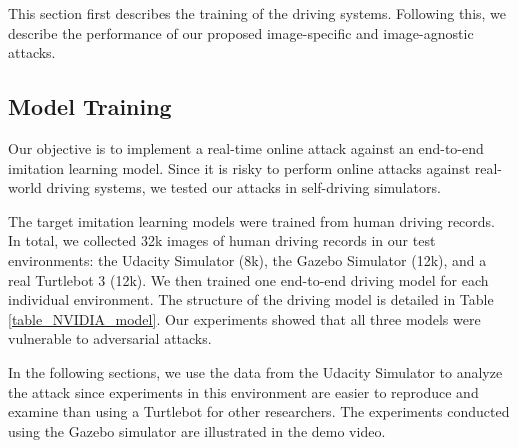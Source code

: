 This section first describes the training of the driving systems. Following this, we describe the performance of our proposed image-specific and image-agnostic attacks.



\subsection{Model Training}

Our objective is to implement a real-time online attack against an end-to-end imitation learning model. Since it is risky to perform online attacks against real-world driving systems, we tested our attacks in self-driving simulators. 

The target imitation learning models were trained from human driving records. In total, we collected 32k images of human driving records in our test environments: the Udacity Simulator (8k), the Gazebo Simulator (12k), and a real Turtlebot 3 (12k). We then trained one end-to-end driving model for each individual environment. The structure of the driving model is detailed in Table \ref{table_NVIDIA_model}.
Our experiments showed that all three models were vulnerable to adversarial attacks. 

In the following sections, we use the data from the Udacity Simulator to analyze the attack since experiments in this environment are easier to reproduce and examine than using a Turtlebot for other researchers. The experiments conducted using the Gazebo simulator are illustrated in the demo video.



